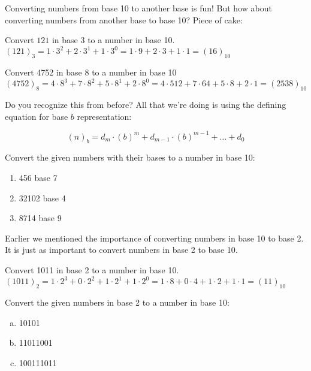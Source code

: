 Converting numbers from base 10 to another base is fun! But how about converting numbers from another base to base 10? Piece of cake:

\begin{example}\label{example:bases:121 base 3}
Convert $121$ in base $3$ to a number in base 10.\\

$(121)_{3}=1\cdot 3^{2}+2\cdot 3^{1}+1\cdot 3^{0}=1\cdot 9+2\cdot 3+1\cdot 1=(16)_{10}$
\end{example}

\begin{example}\label{example:bases:4752 base 8}
Convert 4752 in base 8 to a number in base 10\\

$(4752)_{8}=4\cdot 8^{3}+7\cdot 8^{2}+5\cdot 8^{1}+2\cdot 8^{0}=4\cdot 512+7\cdot 64+5\cdot 8+2\cdot 1=(2538)_{10}$
\end{example}

Do you recognize this from before? All that we're doing is using the defining equation for base $b$ representation:

\begin{equation}
(n)_{b}=d_{m}\cdot (b)^{m}+d_{m-1}\cdot (b)^{m-1}+\hdots+d_{0}
\end{equation}

\begin{exercise}\label{exercise:bases:numbers to base 10}
Convert the given numbers with their bases to a number in base 10:
\begin{enumerate}
\item 456 base 7
\item 32102 base 4
\item 8714 base 9
\end{enumerate}
\end{exercise}

Earlier we mentioned the importance of converting numbers in base 10 to base 2. It is just as important to convert numbers in base 2 to base 10.

\begin{example}\label{example:bases:1011 base 2}
Convert 1011 in base 2 to a number in base 10.\\

$(1011)_{2}=1\cdot 2^{3}+0\cdot 2^{2}+1\cdot 2^{1}+1\cdot 2^{0}=1\cdot 8+0\cdot 4+1\cdot 2+1\cdot 1=(11)_{10}$
\end{example}

\begin{exercise}\label{exercise:bases:base 2 to base 10}
Convert the given numbers in base 2 to a number in base 10:
\begin{enumerate}[(a)]
\item 10101
\item 11011001
\item 100111011
\end{enumerate}
\end{exercise}

